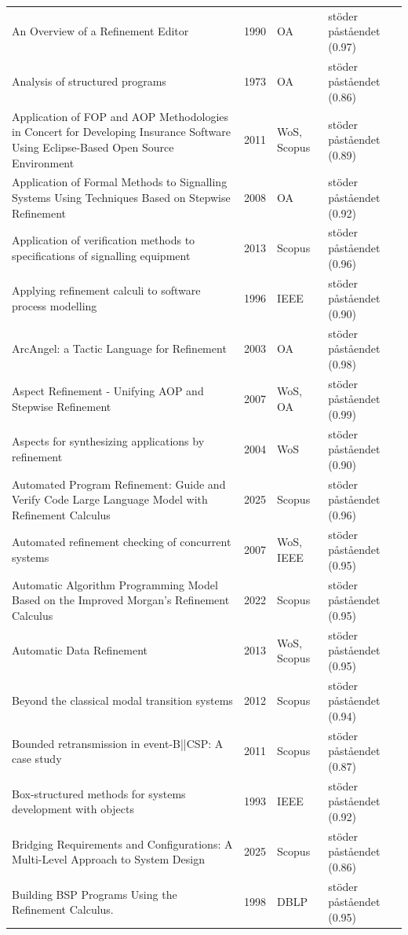 \begin{longtable}{@{}%
  >{\raggedright\arraybackslash}p{}c%
  >{\raggedright\arraybackslash}p{}%
  >{\raggedright\arraybackslash}p{}@{}}
An Overview of a Refinement Editor & 1990 & OA & stöder påståendet (0.97) \\
Analysis of structured programs & 1973 & OA & stöder påståendet (0.86) \\
Application of FOP and AOP Methodologies in Concert for Developing Insurance Software Using Eclipse-Based Open Source Environment & 2011 & WoS, Scopus & stöder påståendet (0.89) \\
Application of Formal Methods to Signalling Systems Using Techniques Based on Stepwise Refinement & 2008 & OA & stöder påståendet (0.92) \\
Application of verification methods to specifications of signalling equipment & 2013 & Scopus & stöder påståendet (0.96) \\
Applying refinement calculi to software process modelling & 1996 & IEEE & stöder påståendet (0.90) \\
ArcAngel: a Tactic Language for Refinement & 2003 & OA & stöder påståendet (0.98) \\
Aspect Refinement - Unifying AOP and Stepwise Refinement & 2007 & WoS, OA & stöder påståendet (0.99) \\
Aspects for synthesizing applications by refinement & 2004 & WoS & stöder påståendet (0.90) \\
Automated Program Refinement: Guide and Verify Code Large Language Model with Refinement Calculus & 2025 & Scopus & stöder påståendet (0.96) \\
Automated refinement checking of concurrent systems & 2007 & WoS, IEEE & stöder påståendet (0.95) \\
Automatic Algorithm Programming Model Based on the Improved Morgan's Refinement Calculus & 2022 & Scopus & stöder påståendet (0.95) \\
Automatic Data Refinement & 2013 & WoS, Scopus & stöder påståendet (0.95) \\
Beyond the classical modal transition systems & 2012 & Scopus & stöder påståendet (0.94) \\
Bounded retransmission in event-B||CSP: A case study & 2011 & Scopus & stöder påståendet (0.87) \\
Box-structured methods for systems development with objects & 1993 & IEEE & stöder påståendet (0.92) \\
Bridging Requirements and Configurations: A Multi-Level Approach to System Design & 2025 & Scopus & stöder påståendet (0.86) \\
Building BSP Programs Using the Refinement Calculus. & 1998 & DBLP & stöder påståendet (0.95) \\

\end{longtable}

